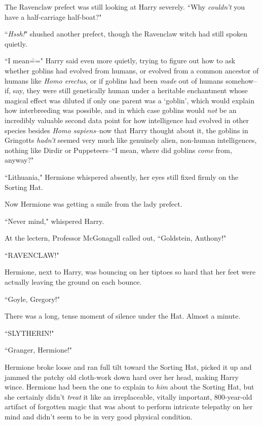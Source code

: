 The Ravenclaw prefect was still looking at Harry severely. ``Why \emph{couldn't} you have a half-carriage half-boat?"

``\emph{Hssh!}" shushed another prefect, though the Ravenclaw witch had still spoken quietly.

``I mean\===" Harry said even more quietly, trying to figure out how to ask whether goblins had evolved from humans, or evolved from a common ancestor of humans like \emph{Homo erectus}, or if goblins had been \emph{made} out of humans somehow\---if, say, they were still genetically human under a heritable enchantment whose magical effect was diluted if only one parent was a `goblin', which would explain how interbreeding was possible, and in which case goblins would \emph{not} be an incredibly valuable second data point for how intelligence had evolved in other species besides \emph{Homo sapiens}\---now that Harry thought about it, the goblins in Gringotts \emph{hadn't} seemed very much like genuinely alien, non-human intelligences, nothing like Dirdir or Puppeteers\---``I mean, where did goblins \emph{come} from, anyway?"

``Lithuania," Hermione whispered absently, her eyes still fixed firmly on the Sorting Hat.

Now Hermione was getting a smile from the lady prefect.

``Never mind," whispered Harry.

At the lectern, Professor McGonagall called out, ``Goldstein, Anthony!"

``RAVENCLAW!"

Hermione, next to Harry, was bouncing on her tiptoes so hard that her feet were actually leaving the ground on each bounce.

``Goyle, Gregory!"

There was a long, tense moment of silence under the Hat. Almost a minute.

``SLYTHERIN!"

``Granger, Hermione!"

Hermione broke loose and ran full tilt toward the Sorting Hat, picked it up and jammed the patchy old cloth-work down hard over her head, making Harry wince. Hermione had been the one to explain to \emph{him} about the Sorting Hat, but she certainly didn't \emph{treat} it like an irreplaceable, vitally important, 800-year-old artifact of forgotten magic that was about to perform intricate telepathy on her mind and didn't seem to be in very good physical condition.

